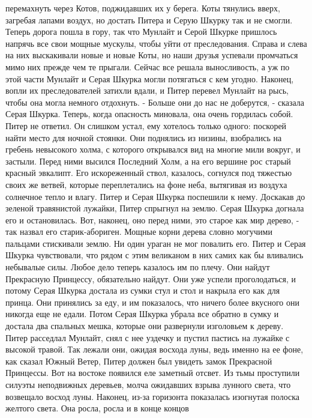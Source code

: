 перемахнуть через Котов, поджидавших их у берега. Коты тянулись вверх, 
загребая лапами воздух, но достать Питера и Серую Шкурку так и не 
смогли.
    Теперь дорога пошла в гору, так что Мунлайт и Серой Шкурке 
пришлось напрячь все свои мощные мускулы, чтобы уйти от преследования. 
Справа и слева на них выскакивали новые и новые Коты, но наши друзья 
успевали промчаться мимо них прежде чем те прыгали.
    Сейчас все решала выносливость, а уж по этой части Мунлайт и Серая 
Шкурка могли потягаться с кем угодно. Наконец, вопли их 
преследователей затихли вдали, и Питер перевел Мунлайт на рысь, чтобы 
она могла немного отдохнуть.
    - Больше они до нас не доберутся, - сказала Серая Шкурка. Теперь, 
когда опасность миновала, она очень гордилась собой.
    Питер не ответил. Он слишком устал, ему хотелось только одного: 
поскорей найти место для ночной стоянки.
    Они поднялись из низины, взобрались на гребень невысокого холма, с 
которого открывался вид на многие мили вокруг, и застыли. Перед ними 
высился Последний Холм, а на его вершине рос старый красный эвкалипт. 
Его искореженный ствол, казалось, согнулся под тяжестью своих же 
ветвей, которые переплетались на фоне неба, вытягивая из воздуха 
солнечное тепло и влагу.
    Питер и Серая Шкурка поспешили к нему. Доскакав до зеленой 
травянистой лужайки, Питер спрыгнул на землю. Серая Шкурка догнала его 
и остановилась. Вот, наконец, оно перед ними, это старое как мир 
дерево, - так назвал его старик-абориген. Мощные корни дерева словно 
могучими пальцами стискивали землю. Ни один ураган не мог повалить 
его. Питер и Серая Шкурка чувствовали, что рядом с этим великаном в 
них самих как бы вливались небывалые силы. Любое дело теперь казалось 
им по плечу. Они найдут Прекрасную Принцессу, обязательно найдут.
    Они уже успели проголодаться, и потому Серая Шкурка достала из 
сумки стул и стол и накрыла его как для принца. Они принялись за еду, 
и им показалось, что ничего более вкусного они никогда еще не едали. 
Потом Серая Шкурка убрала все обратно в сумку и достала два спальных 
мешка, которые они развернули изголовьем к дереву. Питер расседлал 
Мунлайт, снял с нее уздечку и пустил пастись на лужайке с высокой 
травой.
    Так лежали они, ожидая восхода луны, ведь именно на ее фоне, как 
сказал Южный Ветер, Питер должен был увидеть замок Прекрасной 
Принцессы.
    Вот на востоке появился еле заметный отсвет. Из тьмы проступили 
силуэты неподвижных деревьев, молча ожидавших взрыва лунного света, 
что возвещало восход луны. Наконец, из-за горизонта показалась 
изогнутая полоска желтого света. Она росла, росла и в конце концов 
